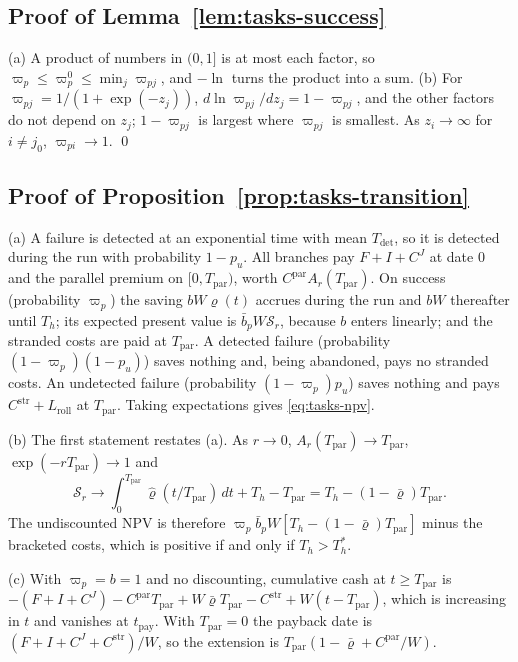 \subsection*{Proof of Lemma~\ref{lem:tasks-success}}

(a) A product of numbers in $(0,1]$ is at most each factor, so $\varpi_p\le\varpi^0_p\le\min_j\varpi_{pj}$, and $-\ln$ turns the product into a sum. (b) For $\varpi_{pj}=1/(1+\exp(-z_j))$, $d\ln\varpi_{pj}/dz_j=1-\varpi_{pj}$, and the other factors do not depend on $z_j$; $1-\varpi_{pj}$ is largest where $\varpi_{pj}$ is smallest. As $z_i\to\infty$ for $i\ne j_0$, $\varpi_{pi}\to 1$. \qed

\subsection*{Proof of Proposition~\ref{prop:tasks-transition}}

(a) A failure is detected at an exponential time with mean $T_{\mathrm{det}}$, so it is detected during the run with probability $1-p_u$. All branches pay $F+I+C^J$ at date 0 and the parallel premium on $[0,T_{\mathrm{par}})$, worth $C^{\mathrm{par}}A_r(T_{\mathrm{par}})$. On success (probability $\varpi_p$) the saving $bW\varrho(t)$ accrues during the run and $bW$ thereafter until $T_h$; its expected present value is $\bar b_pW\mathcal S_r$, because $b$ enters linearly; and the stranded costs are paid at $T_{\mathrm{par}}$. A detected failure (probability $(1-\varpi_p)(1-p_u)$) saves nothing and, being abandoned, pays no stranded costs. An undetected failure (probability $(1-\varpi_p)p_u$) saves nothing and pays $C^{\mathrm{str}}+L_{\mathrm{roll}}$ at $T_{\mathrm{par}}$. Taking expectations gives \eqref{eq:tasks-npv}.

(b) The first statement restates (a). As $r\to 0$, $A_r(T_{\mathrm{par}})\to T_{\mathrm{par}}$, $\exp(-rT_{\mathrm{par}})\to 1$ and
\[
\mathcal S_r\to\int_0^{T_{\mathrm{par}}}\hat\varrho(t/T_{\mathrm{par}})\,dt+T_h-T_{\mathrm{par}}=T_h-(1-\bar\varrho)T_{\mathrm{par}}.
\] The undiscounted NPV is therefore $\varpi_p\bar b_pW[T_h-(1-\bar\varrho)T_{\mathrm{par}}]$ minus the bracketed costs, which is positive if and only if $T_h>T^*_h$.

(c) With $\varpi_p=b=1$ and no discounting, cumulative cash at $t\ge T_{\mathrm{par}}$ is $-(F+I+C^J)-C^{\mathrm{par}}T_{\mathrm{par}}+W\bar\varrho T_{\mathrm{par}}-C^{\mathrm{str}}+W(t-T_{\mathrm{par}})$, which is increasing in $t$ and vanishes at $t_{\mathrm{pay}}$. With $T_{\mathrm{par}}=0$ the payback date is $(F+I+C^J+C^{\mathrm{str}})/W$, so the extension is $T_{\mathrm{par}}(1-\bar\varrho+C^{\mathrm{par}}/W)$.

